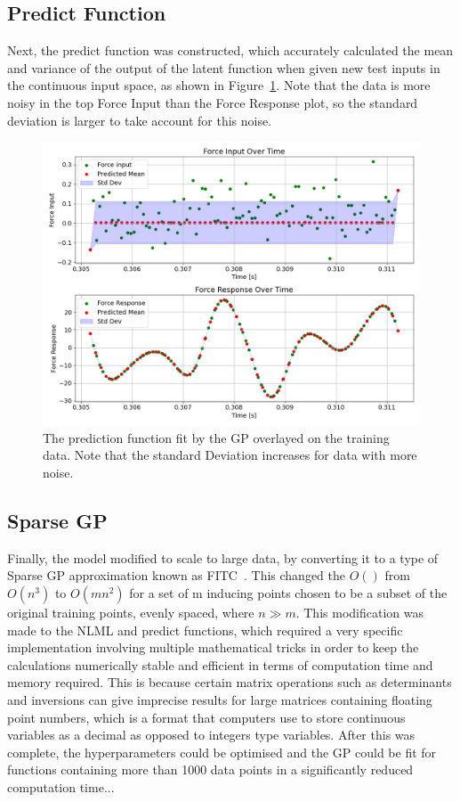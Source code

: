 \documentclass[12pt]{article}
\begin{document}
    \subsection{Predict Function}
    Next, the predict function was constructed, which accurately calculated the mean and variance of the output of the latent function when given new test inputs in the continuous input space, as shown in Figure~\ref{fig:input-response-predict}.
    Note that the data is more noisy in the top Force Input than the Force Response plot, so the standard deviation is larger to take account for this noise.

    \begin{figure}[ht]
        \centering
        \includegraphics[width=1.0\linewidth]{figures/input-response-predict/input-response-predict.png}
        \caption{The prediction function fit by the GP overlayed on the training data. Note that the standard Deviation increases for data with more noise.}
        \label{fig:input-response-predict}
    \end{figure}

    \subsection{Sparse GP}
    Finally, the model modified to scale to large data, by converting it to a type of Sparse GP approximation known as FITC~\cite{q-candela}.
    This changed the $O()$ from $O(n^3)$ to $O(mn^2)$ for a set of m inducing points chosen to be a subset of the original training points, evenly spaced, where $n \gg m$.
    This modification was made to the NLML and predict functions, which required a very specific implementation involving multiple mathematical tricks in order to keep the calculations numerically stable and efficient in terms of computation time and memory required.
    This is because certain matrix operations such as determinants and inversions can give imprecise results for large matrices containing floating point numbers, which is a format that computers use to store continuous variables as a decimal as opposed to integers type variables.
    After this was complete, the hyperparameters could be optimised and the GP could be fit for functions containing more than 1000 data points in a significantly reduced computation time... %
\end{document}
